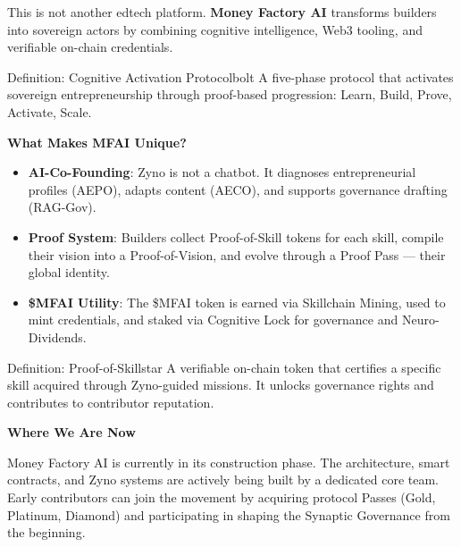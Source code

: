 This is not another edtech platform. \textbf{Money Factory AI} transforms builders into sovereign actors by combining cognitive intelligence, Web3 tooling, and verifiable on-chain credentials.

\begin{mfai-box}{Definition: Cognitive Activation Protocol{\texttrademark}}{bolt}
A five-phase protocol that activates sovereign entrepreneurship through proof-based progression: Learn, Build, Prove, Activate, Scale.
\end{mfai-box}

\vspace{1em}

\textbf{What Makes MFAI Unique?}

\begin{itemize}
  \item \textbf{AI-Co-Founding}: Zyno{\texttrademark} is not a chatbot. It diagnoses entrepreneurial profiles (AEPO{\texttrademark}), adapts content (AECO{\texttrademark}), and supports governance drafting (RAG-Gov{\texttrademark}).
  \item \textbf{Proof System}: Builders collect Proof-of-Skill{\texttrademark} tokens for each skill, compile their vision into a Proof-of-Vision{\texttrademark}, and evolve through a Proof Pass{\texttrademark} — their global identity.
  \item \textbf{\$MFAI Utility}: The \$MFAI token is earned via Skillchain Mining{\texttrademark}, used to mint credentials, and staked via Cognitive Lock{\texttrademark} for governance and Neuro-Dividends{\texttrademark}.
\end{itemize}

\vspace{0.5em}

\begin{mfai-box}{Definition: Proof-of-Skill{\texttrademark}}{star}
A verifiable on-chain token that certifies a specific skill acquired through Zyno-guided missions. It unlocks governance rights and contributes to contributor reputation.
\end{mfai-box}

\vspace{1em}

\textbf{Where We Are Now}

Money Factory AI is currently in its construction phase. The architecture, smart contracts, and Zyno{\texttrademark} systems are actively being built by a dedicated core team. Early contributors can join the movement by acquiring protocol Passes (Gold, Platinum, Diamond) and participating in shaping the Synaptic Governance{\texttrademark} from the beginning.

